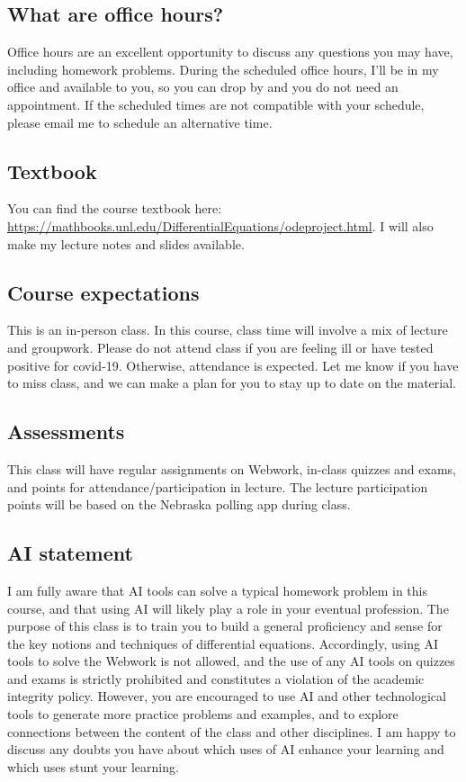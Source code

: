\documentclass[12pt]{amsart}
\begin{document}
	\subsection*{What are office hours?} 
Office hours are an excellent opportunity to discuss any questions you may have, including homework problems. 
During the scheduled office hours, I'll be in my office and available to you, so you can drop by and you {do not need an appointment}. If the scheduled times are not compatible with your schedule, please email me to schedule an alternative time. 


	\subsection*{Textbook} You can find the course textbook here:\\ \href{https://mathbooks.unl.edu/DifferentialEquations/odeproject.html}{https://mathbooks.unl.edu/DifferentialEquations/odeproject.html}. I will also make my lecture notes and slides available.
	
\subsection*{Course expectations} 
This is an { in-person} class.  In this course, class time will involve a mix of lecture and groupwork. 
Please {do not} attend class if you are feeling ill or have tested positive for covid-19. Otherwise, {attendance is expected}. Let me know if you have to miss class, and we can make a plan for you to stay up to date on the material.



\subsection*{Assessments}
This class will have regular assignments on Webwork, in-class quizzes and exams, and points for attendance/participation in lecture. The lecture participation points will be based on the Nebraska polling app during class.


\subsection*{AI statement} 
I am fully aware that AI tools can solve a typical homework problem in this course, and that using AI will likely play a role in your eventual profession. The purpose of this class is to train you to build a general proficiency and sense for the key notions and techniques of differential equations. Accordingly, using AI tools to solve the Webwork is {not} allowed, and the use of any AI tools on quizzes and exams is strictly prohibited and constitutes a violation of the academic integrity policy. However, you are encouraged to use AI and other technological tools to generate more practice problems and examples, and to explore connections between the content of the class and other disciplines. I am happy to discuss any doubts you have about which uses of AI enhance your learning and which uses stunt your learning. 
\end{document}

